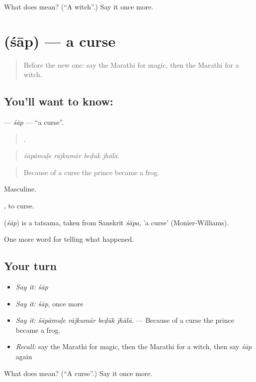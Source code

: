 \begin{tcolorbox}[breakable,colback=teal!4,colframe=teal!35!black,title={Before you move on}]
What does  mean? (\textquotedblleft{}A witch\textquotedblright{}.) Say it once more.
\end{tcolorbox}
\section[\texorpdfstring{\mr{शाप} (śāp)}{शाप (śāp)}]{ (śāp) — a curse}

\label{lesson:MR-C338-sap}



\begin{quote}
Before the new one: say the Marathi for magic, then the Marathi for a witch.
\end{quote}

\subsection*{You'll want to know: }
\textbf{} — \emph{śāp} — \textquotedblleft{}a curse\textquotedblright{}.

\begin{quote}
   .
\end{quote}

\begin{quote}
\emph{śāpāmuḷe rājkumār beḍūk jhālā.}
\end{quote}

\begin{quote}
Because of a curse the prince became a frog.
\end{quote}

Masculine.

 , to curse.

\begin{cousinweb}
\textbf{} (\emph{śāp}) is a tatsama, taken from Sanskrit \emph{śāpa}, 'a curse' (Monier-Williams).
\end{cousinweb}

\begin{grammarlens}[title={What you've built}]
One more word for telling what happened.
\end{grammarlens}

\subsection*{Your turn}
\begin{itemize}
\raggedright
  \item \emph{Say it:} \emph{śāp}
  \item \emph{Say it:} \emph{śāp}, once more
  \item \emph{Say it:} \emph{śāpāmuḷe rājkumār beḍūk jhālā.} — Because of a curse the prince became a frog.
  \item \emph{Recall:} say the Marathi for magic, then the Marathi for a witch, then say \emph{śāp} again
\end{itemize}

\begin{tcolorbox}[breakable,colback=teal!4,colframe=teal!35!black,title={Before you move on}]
What does  mean? (\textquotedblleft{}A curse\textquotedblright{}.) Say it once more.
\end{tcolorbox}
